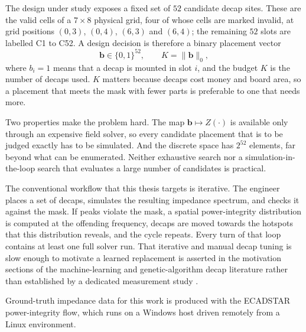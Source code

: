 The design under study exposes a fixed set of $52$ candidate decap sites. These are the valid cells
of a $7 \times 8$ physical grid, four of whose cells are marked invalid, at grid positions
$(0,3)$, $(0,4)$, $(6,3)$ and $(6,4)$; the remaining $52$ slots are labelled C1 to C52. A design
decision is therefore a binary placement vector
%
\begin{equation}
  \mathbf{b} \in \{0,1\}^{52},
  \qquad
  K = \lVert \mathbf{b} \rVert_0 ,
  \label{eq:placement_vector}
\end{equation}
%
where $b_i = 1$ means that a decap is mounted in slot $i$, and the budget $K$ is the number of
decaps used. $K$ matters because decaps cost money and board area, so a placement that meets the
mask with fewer parts is preferable to one that needs more.

Two properties make the problem hard. The map $\mathbf{b} \mapsto Z(\cdot)$ is available only
through an expensive field solver, so every candidate placement that is to be judged exactly has
to be simulated. And the discrete space has $2^{52}$ elements, far beyond what can be enumerated.
Neither exhaustive search nor a simulation-in-the-loop search that evaluates a large number of
candidates is practical.

The conventional workflow that this thesis targets is iterative. The engineer places a set of
decaps, simulates the resulting impedance spectrum, and checks it against the mask. If peaks
violate the mask, a spatial power-integrity distribution is computed at the offending frequency,
decaps are moved towards the hotspots that this distribution reveals, and the cycle repeats. Every
turn of that loop contains at least one full solver run.
That iterative and manual decap tuning is slow enough to motivate a learned replacement is asserted
in the motivation sections of the machine-learning and genetic-algorithm decap literature rather
than established by a dedicated measurement study
\cite{swaminathan2020demystifying,zhang2020enhanced,ars2023ai,convga2024gcn}.

Ground-truth impedance data for this work is produced with the ECADSTAR power-integrity flow, which
runs on a Windows host driven remotely from a Linux environment.

